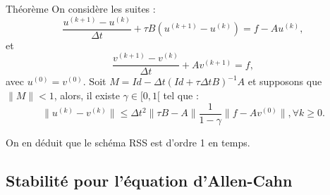 \documentclass[11pt]{beamer}
\begin{document}
\begin{frame}
\begin{block}{Théorème}\label{RSSPrec}
On considère les suites :
$$
 \dfrac{u^{(k+1)}-u^{(k)}}{\Delta t} +\tau B (u^{(k+1)}-u^{(k)}) =f-Au^{(k)},
 $$
et
$$
 \dfrac{v^{(k+1)}-v^{(k)}}{\Delta t} +A v^{(k+1)} =f,
 $$
 avec  $u^{(0)}=v^{(0)}$. Soit $M=Id-\Delta t(Id+\tau \Delta t B)^{-1}A$ et supposons que $\parallel M\parallel < 1$,
 alors, il existe $\gamma \in [0,1[$ tel que :
 $$
\parallel u^{(k)}- v^{(k)}\parallel \le  \Delta t^2 \parallel  \tau B-A\parallel \dfrac{1}{1-\gamma}\parallel  f-Av^{(0)} \parallel  , \forall k \ge 0.
$$
\end{block}
On en déduit que le schéma RSS est d'ordre 1 en temps.
\end{frame}

\subsection{Stabilité pour l'équation d'Allen-Cahn}
\end{document}
